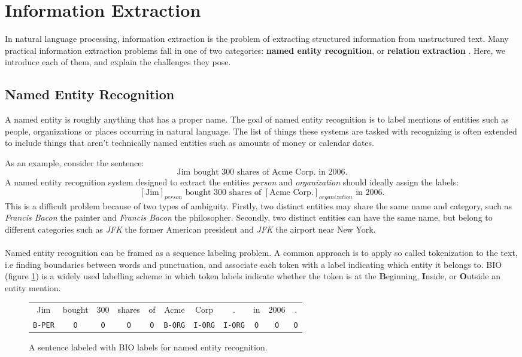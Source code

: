 \section{Information Extraction}
\label{information_extraction}
In natural language processing, information extraction is the problem of extracting structured information from unstructured text. Many practical information extraction problems fall in one of two categories: \textbf{named entity recognition}, or \textbf{relation extraction} \citep{jurafsky09}. Here, we introduce each of them, and explain the challenges they pose.

\subsection{Named Entity Recognition}
\label{named_entity_recognition}
A named entity is roughly anything that has a proper name. The goal of named entity recognition is to label mentions of entities such as people, organizations or places occurring in natural language. The list of things these systems are tasked with recognizing is often extended to include things that aren't technically named entities such as amounts of money or calendar dates.

As an example, consider the sentence: 
$$
\text{Jim bought 300 shares of Acme Corp. in 2006.}
$$ 
A named entity recognition system designed to extract the entities \textit{person} and \textit{organization} should ideally assign the labels:
$$
	[\text{Jim}]_{person} \text{ bought 300 shares of } [\text{Acme Corp.}]_{organization} \text{ in 2006.}
$$
This is a difficult problem because of two types of ambiguity. Firstly, two distinct entities may share the same name and category, such as \textit{Francis Bacon} the painter and \textit{Francis Bacon} the philosopher. Secondly, two distinct entities can have the same name, but belong to different categories such as \textit{JFK} the former American president and \textit{JFK} the airport near New York.
\\\\
Named entity recognition can be framed as a sequence labeling problem. A common approach is to apply so called tokenization to the text, i.e finding boundaries between words and punctuation, and associate each token with a label indicating which entity it belongs to. BIO (figure \ref{bio}) is a widely used labelling scheme in which token labels indicate whether the token is at the \textbf{B}eginning, \textbf{I}nside, or \textbf{O}utside an entity mention.
\begin{figure}
	\begin{center}
		\begin{tabular}{c c c c c c c c c c c}
	Jim & bought & 300 & shares & of & Acme & Corp & . & in & 2006 & . \\
	\texttt{B-PER} & \texttt{O} & \texttt{O} & \texttt{O} & \texttt{O} & \texttt{B-ORG} & \texttt{I-ORG} & \texttt{I-ORG} & \texttt{O} & \texttt{O} & \texttt{O}
	\end{tabular}
	\end{center}
	\caption{A sentence labeled with BIO labels for named entity recognition.}
	\label{bio}
\end{figure}

